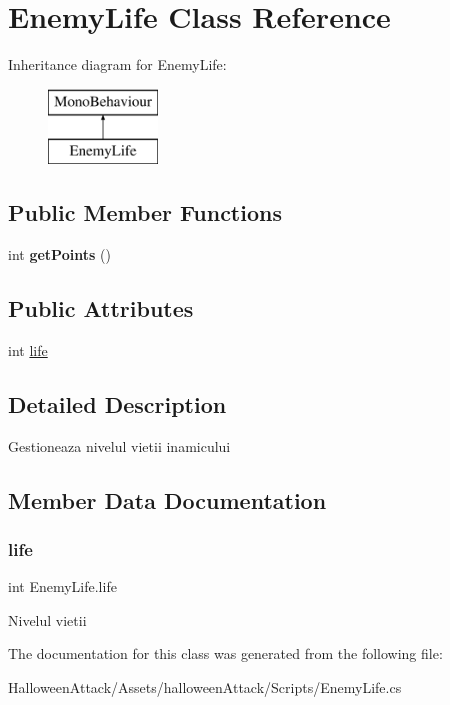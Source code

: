 \hypertarget{class_enemy_life}{}\section{Enemy\+Life Class Reference}
\label{class_enemy_life}
Inheritance diagram for Enemy\+Life\+:\begin{figure}[H]
\begin{center}
\leavevmode
\includegraphics[height=2.000000cm]{class_enemy_life}
\end{center}
\end{figure}
\subsection*{Public Member Functions}
\begin{DoxyCompactItemize}
\item 
\mbox{\label{class_enemy_life_a04184d58b33094d37f07c4a680f46915}} 
int {\bfseries get\+Points} ()
\end{DoxyCompactItemize}
\subsection*{Public Attributes}
\begin{DoxyCompactItemize}
\item 
int \hyperlink{class_enemy_life_a1a9366e42605193f61910a80ed0d177e}{life}
\end{DoxyCompactItemize}


\subsection{Detailed Description}
Gestioneaza nivelul vietii inamicului 

\subsection{Member Data Documentation}
\mbox{\label{class_enemy_life_a1a9366e42605193f61910a80ed0d177e}} 
\subsubsection{\texorpdfstring{life}{life}}
{\footnotesize\ttfamily int Enemy\+Life.\+life}

Nivelul vietii 

The documentation for this class was generated from the following file\+:\begin{DoxyCompactItemize}
\item 
Halloween\+Attack/\+Assets/halloween\+Attack/\+Scripts/Enemy\+Life.\+cs\end{DoxyCompactItemize}
